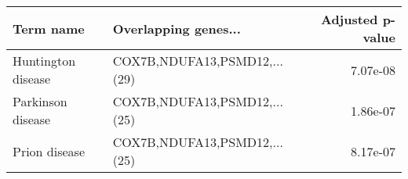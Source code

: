 \begin{tabular}{llr}
\toprule
         Term name &         Overlapping genes... &  Adjusted p-value \\
\midrule
Huntington disease & COX7B,NDUFA13,PSMD12,...(29) &          7.07e-08 \\
 Parkinson disease & COX7B,NDUFA13,PSMD12,...(25) &          1.86e-07 \\
     Prion disease & COX7B,NDUFA13,PSMD12,...(25) &          8.17e-07 \\
\bottomrule
\end{tabular}
